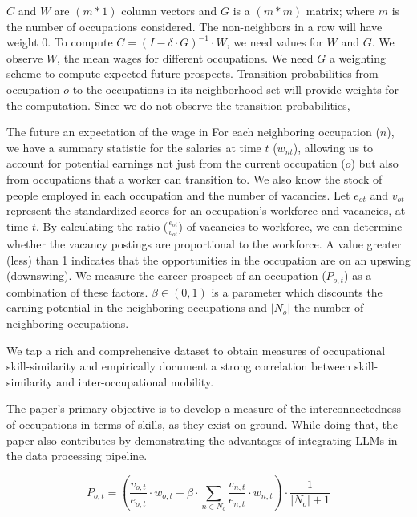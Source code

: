 \documentclass{article}
\begin{document}
$C$ and $W$ are $(m*1)$ column vectors and $G$ is a $(m*m)$ matrix; where $m$ is the number of occupations considered. The non-neighbors in a row will have weight $0$. To compute $C = (I - \delta \cdot G)^{-1} \cdot W$, we need values for $W$ and $G$. We observe $W$, the mean wages for different occupations. We need $G$ a weighting scheme to compute expected future prospects. Transition probabilities from occupation $o$ to the occupations in its neighborhood set will provide weights for the computation. Since we do not observe the transition probabilities, 



The future an expectation of the wage in  For each neighboring occupation ($n$), we have a summary statistic for the salaries at time $t$ ($w_{nt}$), allowing us to account for potential earnings not just from the current occupation ($o$) but also from occupations that a worker can transition to. We also know the stock of people employed in each occupation and the number of vacancies. Let $e_{ot}$ and $v_{ot}$ represent the standardized scores for an occupation's workforce and vacancies, at time $t$. By calculating the ratio ($\frac{e_{ot}}{v_{ot}}$) of vacancies to workforce, we can determine whether the vacancy postings are proportional to the workforce. A value greater (less) than 1 indicates that the opportunities in the occupation are on an upswing (downswing). We measure the career prospect of an occupation ($P_{o,t}$) as a combination of these factors. $\beta \in (0, 1)$ is a parameter which discounts the earning potential in the neighboring occupations and $|N_o|$ the number of neighboring occupations. 



We tap a rich and comprehensive dataset to obtain measures of occupational skill-similarity and empirically document a strong correlation between skill-similarity and inter-occupational mobility. 

The paper's primary objective is to develop a measure of the interconnectedness of occupations in terms of skills, as they exist on ground. While doing that, the paper also contributes by demonstrating the advantages of integrating LLMs in the data processing pipeline. 




\begin{equation}
P_{o,t} = \left(\frac{v_{o,t}}{e_{o,t}} \cdot w_{o,t} + \beta \cdot \sum_{n \in N_o}\frac{v_{n,t}}{e_{n,t}} \cdot w_{n,t}\right) \cdot \frac{1}{|N_o|+1}
\end{equation}
\end{document}
